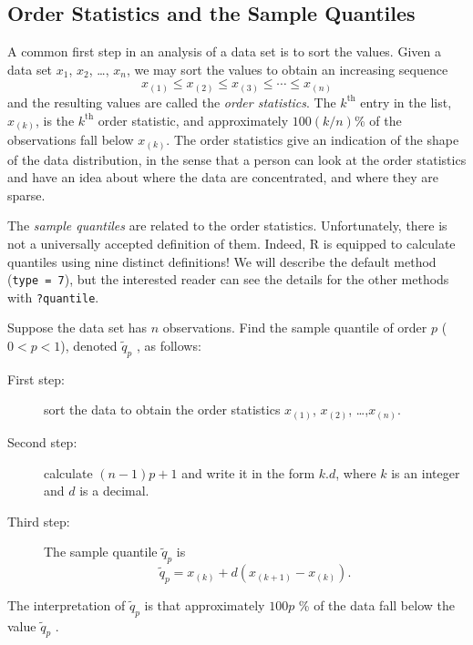 \documentclass[captions=tableheading]{scrbook}
\begin{document}
\subsection{Order Statistics and the Sample Quantiles}
\label{sec-3-3-3}

\label{sub:Order-Statistics-and}

A common first step in an analysis of a data set is to sort the values. Given a data set \(x_{1}\), \(x_{2}\), \ldots{}, \(x_{n}\), we may sort the values to obtain an increasing sequence
\begin{equation} 
x_{(1)}\leq x_{(2)}\leq x_{(3)}\leq\cdots\leq x_{(n)}
\end{equation}
and the resulting values are called the \emph{order statistics}. The \(k^{\mathrm{th}}\) entry in the list, \(x_{(k)}\), is the \(k^{\mathrm{th}}\) order statistic, and approximately \(100(k/n)\)\% of the observations fall below \(x_{(k)}\). The order statistics give an indication of the shape of the data distribution, in the sense that a person can look at the order statistics and have an idea about where the data are concentrated, and where they are sparse.

The \emph{sample quantiles} are related to the order statistics. Unfortunately, there is not a universally accepted definition of them. Indeed, \textsf{R} is equipped to calculate quantiles using nine distinct definitions! We will describe the default method (\texttt{type = 7}), but the interested reader can see the details for the other methods with \texttt{?quantile}.

Suppose the data set has \(n\) observations. Find the sample quantile of order \(p\) (\(0<p<1\)), denoted \(\tilde{q}_{p}\) , as follows: 

\begin{description}
\item[First step:] sort the data to obtain the order statistics \(x_{(1)}\), \(x_{(2)}\), \ldots{},\(x_{(n)}\).
\item[Second step:] calculate \((n-1)p+1\) and write it in the form \(k.d\), where \(k\) is an integer and \(d\) is a decimal.
\item[Third step:] The sample quantile \(\tilde{q}_{p}\) is
   \begin{equation}
      \tilde{q}_{p}=x_{(k)}+d(x_{(k+1)}-x_{(k)}).
   \end{equation}
\end{description}

The interpretation of \(\tilde{q}_{p}\) is that approximately \(100p\) \% of the data fall below the value \(\tilde{q}_{p}\) . 
\end{document}
